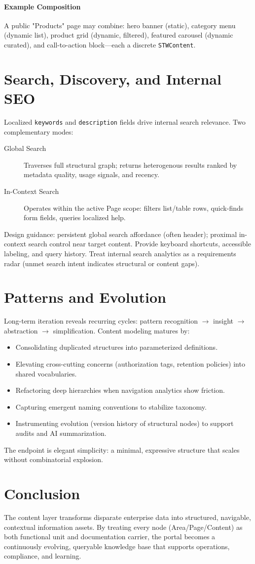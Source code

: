 \paragraph{Example Composition} A public "Products" page may combine: hero banner (static), category menu (dynamic list), product grid (dynamic, filtered), featured carousel (dynamic curated), and call-to-action block—each a discrete \texttt{STWContent}.

\section{Search, Discovery, and Internal SEO}
Localized \texttt{keywords} and \texttt{description} fields drive internal search relevance. Two complementary modes:
\begin{description}
	\item[Global Search] Traverses full structural graph; returns heterogenous results ranked by metadata quality, usage signals, and recency.
	\item[In-Context Search] Operates within the active Page scope: filters list/table rows, quick-finds form fields, queries localized help.
\end{description}
Design guidance: persistent global search affordance (often header); proximal in-context search control near target content. Provide keyboard shortcuts, accessible labeling, and query history. Treat internal search analytics as a requirements radar (unmet search intent indicates structural or content gaps).

\section{Patterns and Evolution}
Long-term iteration reveals recurring cycles: pattern recognition $\rightarrow$ insight $\rightarrow$ abstraction $\rightarrow$ simplification. Content modeling matures by:
\begin{itemize}
	\item Consolidating duplicated structures into parameterized definitions.
	\item Elevating cross-cutting concerns (authorization tags, retention policies) into shared vocabularies.
	\item Refactoring deep hierarchies when navigation analytics show friction.
	\item Capturing emergent naming conventions to stabilize taxonomy.
	\item Instrumenting evolution (version history of structural nodes) to support audits and AI summarization.
\end{itemize}
The endpoint is elegant simplicity: a minimal, expressive structure that scales without combinatorial explosion.

\section{Conclusion}
The content layer transforms disparate enterprise data into structured, navigable, contextual information assets. By treating every node (Area/Page/Content) as both functional unit and documentation carrier, the portal becomes a continuously evolving, queryable knowledge base that supports operations, compliance, and learning.
